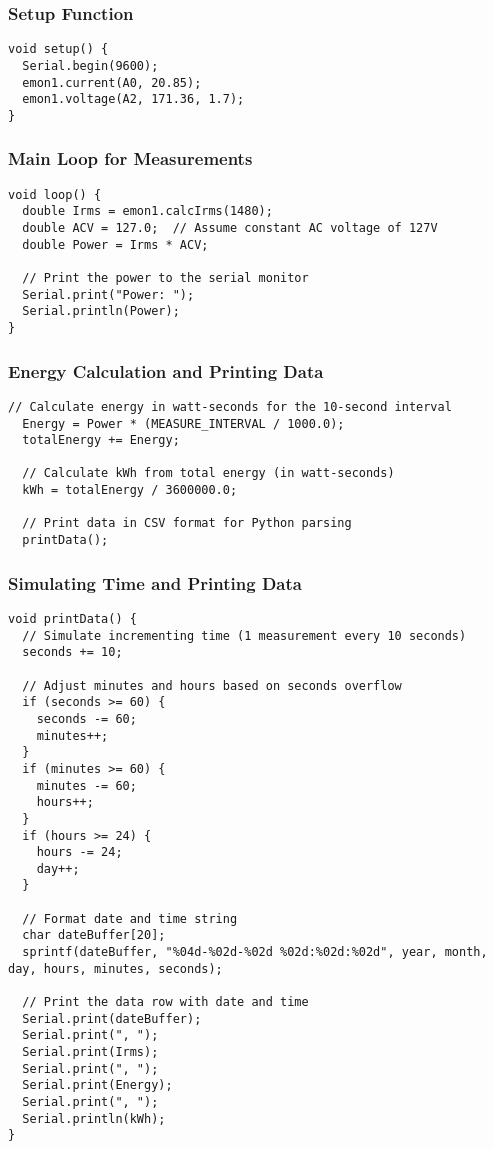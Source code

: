 \subsubsection{Setup Function}
\begin{lstlisting}[style=Arduino]
void setup() {
  Serial.begin(9600);  
  emon1.current(A0, 20.85);  
  emon1.voltage(A2, 171.36, 1.7);  
}
\end{lstlisting}

\subsubsection{Main Loop for Measurements}
\begin{lstlisting}[style=Arduino]
void loop() {
  double Irms = emon1.calcIrms(1480); 
  double ACV = 127.0;  // Assume constant AC voltage of 127V
  double Power = Irms * ACV; 
  
  // Print the power to the serial monitor
  Serial.print("Power: ");
  Serial.println(Power);
}
\end{lstlisting}

\subsubsection{Energy Calculation and Printing Data}
\begin{lstlisting}[style=Arduino]
  // Calculate energy in watt-seconds for the 10-second interval
  Energy = Power * (MEASURE_INTERVAL / 1000.0);   
  totalEnergy += Energy;                          

  // Calculate kWh from total energy (in watt-seconds)
  kWh = totalEnergy / 3600000.0;  

  // Print data in CSV format for Python parsing
  printData();
\end{lstlisting}

\subsubsection{Simulating Time and Printing Data}
\begin{lstlisting}[style=Arduino]
void printData() {
  // Simulate incrementing time (1 measurement every 10 seconds)
  seconds += 10; 

  // Adjust minutes and hours based on seconds overflow
  if (seconds >= 60) {
    seconds -= 60;
    minutes++;
  }
  if (minutes >= 60) {
    minutes -= 60;
    hours++;
  }
  if (hours >= 24) {
    hours -= 24;
    day++;
  }

  // Format date and time string
  char dateBuffer[20];
  sprintf(dateBuffer, "%04d-%02d-%02d %02d:%02d:%02d", year, month, day, hours, minutes, seconds);

  // Print the data row with date and time
  Serial.print(dateBuffer);
  Serial.print(", ");
  Serial.print(Irms);
  Serial.print(", ");
  Serial.print(Energy);
  Serial.print(", ");
  Serial.println(kWh);
}
\end{lstlisting}